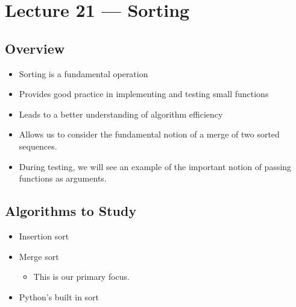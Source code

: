 \documentclass[letterpaper,10pt,english]{sphinxmanual}
\begin{document}
\chapter{Lecture 21 — Sorting}
\label{\detokenize{lecture_notes/lec21_sorting:lecture-21-sorting}}\label{\detokenize{lecture_notes/lec21_sorting::doc}}

\section{Overview}
\label{\detokenize{lecture_notes/lec21_sorting:overview}}\begin{itemize}
\item {} 
Sorting is a fundamental operation

\item {} 
Provides good practice in implementing and testing small functions

\item {} 
Leads to a better understanding of algorithm efficiency

\item {} 
Allows us to consider the fundamental notion of a merge of two sorted
sequences.

\item {} 
During testing, we will see an example of the important notion of
passing functions as arguments.

\end{itemize}


\section{Algorithms to Study}
\label{\detokenize{lecture_notes/lec21_sorting:algorithms-to-study}}\begin{itemize}
\item {} 
Insertion sort

\item {} 
Merge sort
\begin{itemize}
\item {} 
This is our primary focus.

\end{itemize}

\item {} 
Python’s built in sort

\end{itemize}
\end{document}
